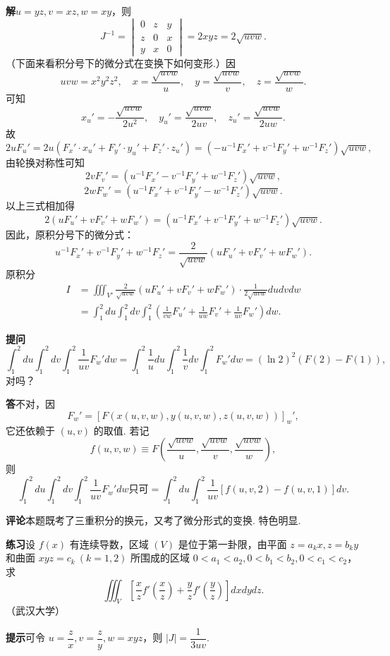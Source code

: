 \documentclass[UTF8, 12pt, fontset=fandol, oneside]{ctexart}
\begin{document}
\noindent\textbf{解}\quad $u=yz,v=xz,w=xy$，则
\[
J^{-1}=
\begin{vmatrix}
0&z&y\\
z&0&x\\
y&x&0
\end{vmatrix}
=2xyz=2\sqrt{uvw}.
\]
（下面来看积分号下的微分式在变换下如何变形.）因
\[
uvw=x^2y^2z^2,\quad
x=\frac{\sqrt{uvw}}u,\quad
y=\frac{\sqrt{uvw}}v,\quad
z=\frac{\sqrt{uvw}}w.
\]
可知
\[
x_u'=-\frac{\sqrt{uvw}}{2u^2},\quad
y_u'=\frac{\sqrt{uvw}}{2uv},\quad
z_u'=\frac{\sqrt{uvw}}{2uw}.
\]
故
\[
2uF_u'=2u(F_x'\cdot x_u'+F_y'\cdot y_u'+F_z'\cdot z_u')
=(-u^{-1}F_x'+v^{-1}F_y'+w^{-1}F_z')\sqrt{uvw},
\]
由轮换对称性可知
\[
2vF_v'=(u^{-1}F_x'-v^{-1}F_y'+w^{-1}F_z')\sqrt{uvw},
\]
\[
2wF_w'=(u^{-1}F_x'+v^{-1}F_y'-w^{-1}F_z')\sqrt{uvw}.
\]
以上三式相加得
\[
2(uF_u'+vF_v'+wF_w')
=(u^{-1}F_x'+v^{-1}F_y'+w^{-1}F_z')\sqrt{uvw}.
\]
因此，原积分号下的微分式：
\[
u^{-1}F_x'+v^{-1}F_y'+w^{-1}F_z'
=\frac2{\sqrt{uvw}}(uF_u'+vF_v'+wF_w').
\]
原积分
\[
\begin{aligned}
I&=\iiint_{V'}\frac2{\sqrt{uvw}}(uF_u'+vF_v'+wF_w')\cdot\frac1{2\sqrt{uvw}}dudvdw\\
&=\int_1^2du\int_1^2dv\int_1^2
\left(\frac1{vw}F_u'+\frac1{uw}F_v'+\frac1{uv}F_w'\right)dw.
\end{aligned}
\]

\noindent\textbf{提问}\quad
\[
\int_1^2du\int_1^2dv\int_1^2\frac1{uv}F_w'dw
=\int_1^2\frac1u du\int_1^2\frac1v dv\int_1^2F_w'dw
=(\ln2)^2(F(2)-F(1)),
\]
对吗？

\noindent\textbf{答}\quad 不对，因
\[
F_w'=\left[F(x(u,v,w),y(u,v,w),z(u,v,w))\right]_w',
\]
它还依赖于 $(u,v)$ 的取值. 若记
\[
f(u,v,w)\equiv F\left(\frac{\sqrt{uvw}}u,\frac{\sqrt{uvw}}v,\frac{\sqrt{uvw}}w\right),
\]
则
\[
\int_1^2du\int_1^2dv\int_1^2\frac1{uv}F_w'dw
\text{只可}=\int_1^2du\int_1^2\frac1{uv}[f(u,v,2)-f(u,v,1)]dv.
\]

\noindent\textbf{评论}\quad 本题既考了三重积分的换元，又考了微分形式的变换. 特色明显.

\noindent\textbf{练习}\quad 设 $f(x)$ 有连续导数，区域 $(V)$ 是位于第一卦限，由平面 $z=a_kx,z=b_ky$ 和曲面 $xyz=c_k\ (k=1,2)$ 所围成的区域 $0<a_1<a_2,0<b_1<b_2,0<c_1<c_2$，求
\[
\iiint_V\left[\frac xz f'\left(\frac xz\right)+
\frac yz f'\left(\frac yz\right)\right]dxdydz.
\]
（武汉大学）

\noindent\textbf{提示}\quad 可令 $u=\dfrac zx,v=\dfrac zy,w=xyz$，则 $|J|=\dfrac1{3uv}$.
\end{document}
